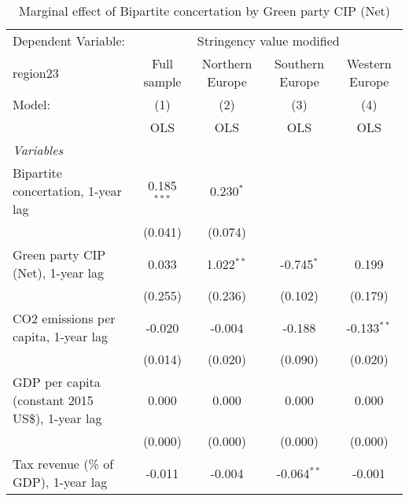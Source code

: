 
\begin{table}[htbp]
   \caption{Marginal effect of Bipartite concertation by Green party CIP (Net)}
   \centering
   \begin{tabular}{lcccc}
      \toprule
      Dependent Variable: & \multicolumn{4}{c}{Stringency value modified}\\
      region23                                                               & Full sample   & Northern Europe & Southern Europe & Western Europe \\   
      Model:                                                                 & (1)           & (2)             & (3)             & (4)\\  
                                                                             &  OLS          & OLS             & OLS             & OLS\\  
      \midrule
      \emph{Variables}\\
      Bipartite concertation, 1-year lag                                     & 0.185$^{***}$ & 0.230$^{*}$     &                 &   \\   
                                                                             & (0.041)       & (0.074)         &                 &   \\   
      Green party CIP (Net), 1-year lag                                      & 0.033         & 1.022$^{**}$    & -0.745$^{*}$    & 0.199\\   
                                                                             & (0.255)       & (0.236)         & (0.102)         & (0.179)\\   
      CO2 emissions per capita, 1-year lag                                   & -0.020        & -0.004          & -0.188          & -0.133$^{**}$\\   
                                                                             & (0.014)       & (0.020)         & (0.090)         & (0.020)\\   
      GDP per capita (constant 2015 US\$), 1-year lag                        & 0.000         & 0.000           & 0.000           & 0.000\\   
                                                                             & (0.000)       & (0.000)         & (0.000)         & (0.000)\\   
      Tax revenue (\% of GDP), 1-year lag                                    & -0.011        & -0.004          & -0.064$^{**}$   & -0.001\\   

\end{tabular}
\end{table}
